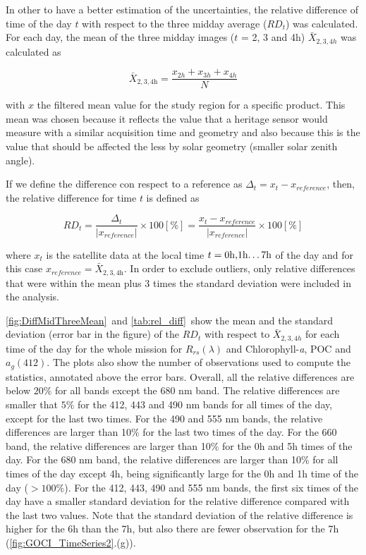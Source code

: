 \documentclass[onecolumn,3p,letterpaper,11pt]{elsarticle}
\begin{document}
In other to have a better estimation of the uncertainties, the relative difference of time of the day $t$ with respect to the three midday average ($RD_t$) was calculated. For each day, the mean of the three midday images ($t$ = 2, 3 and 4h) $\bar{X}_{2,3,4h}$ was calculated as
\begin{linenomath*}
\begin{equation}
	\bar{X}_{2,3,4\text{h}} = \frac{x_{2h}+x_{3h}+x_{4h}}{N}
\end{equation}
\end{linenomath*}
with $x$ the filtered mean value for the study region for a specific product.
This mean was chosen because it reflects the value that a heritage sensor would measure with a similar acquisition time and geometry and also because this is the value that should be affected the less by solar geometry (smaller solar zenith angle). 

If we define the difference con respect to a reference as $\Delta_t=x_t-x_{reference}$, then, the relative difference for time $t$ is defined as
\begin{linenomath*}
\begin{equation}
	RD_t = \frac{\Delta_t}{|x_{reference}|} \times 100[\%] = \frac{x_t-x_{reference}}{|x_{reference}|}
	\times 100[\%]
\end{equation}
\end{linenomath*}
where $x_t$ is the satellite data at the local time $t=\text{0h,1h\dots7h}$ of the day and for this case $x_{reference}=\bar{X}_{2,3,4\text{h}}$. In order to exclude outliers, only relative differences that were within the mean plus 3 times the standard deviation were included in the analysis.

\autoref{fig:DiffMidThreeMean}~and \autoref{tab:rel_diff}~show the mean and the standard deviation (error bar in the figure) of the $RD_t$ with respect to $\bar{X}_{2,3,4h}$ for each time of the day for the whole mission for $R_{rs}(\lambda)$ and Chlorophyll-{\it a}, POC and $a_g(412)$. 
The plots also show the number of observations used to compute the statistics, annotated above the error bars. 
Overall, all the relative differences are below $20\%$ for all bands except the 680 nm band.
The relative differences are smaller that $5\%$ for the 412, 443 and 490 nm bands for all times of the day, except for the last two times. 
For the 490 and 555 nm bands, the relative differences are larger than 10\% for the last two times of the day. 
For the 660 band, the relative differences are larger than 10\% for the 0h and 5h times of the day. 
For the 680 nm band, the relative differences are larger than 10\% for all times of the day except 4h, being significantly large for the 0h and 1h time of the day ($>100\%$).
For the 412, 443, 490 and 555 nm bands, the first six times of the day have a smaller standard deviation for the relative difference compared with the last two values. 
Note that the standard deviation of the relative difference is higher for the 6h than the 7h, but also there are fewer observation for the 7h (\autoref{fig:GOCI_TimeSeries2}.(g)).
\end{document}

